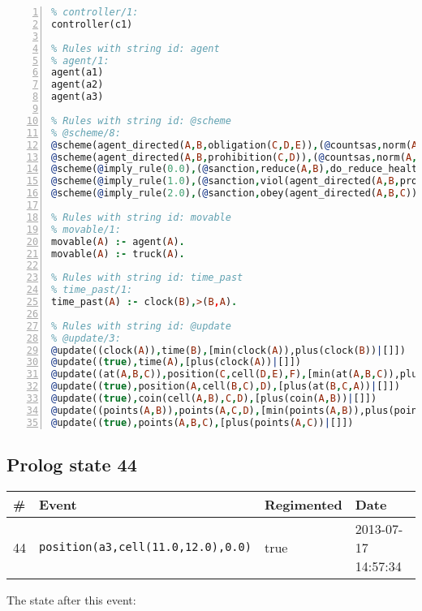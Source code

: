 \documentclass[11pt]{article}\usepackage[utf8]{inputenc}\usepackage{geometry}
\begin{document}
\begin{lstlisting}[language=Prolog, numbers=left]
% Rules with string id: controller
% controller/1:
controller(c1)

% Rules with string id: agent
% agent/1:
agent(a1)
agent(a2)
agent(a3)

% Rules with string id: @scheme
% @scheme/8:
@scheme(agent_directed(A,B,obligation(C,D,E)),(@countsas,norm(A,B,F,obligation(C,D,E)),F),false,(listTrue(C)),(time_past(D)),false,[plus(viol(agent_directed(A,B,obligation(C,D,E))))|[]],[plus(obey(agent_directed(A,B,obligation(C,D,E))))|[]])
@scheme(agent_directed(A,B,prohibition(C,D)),(@countsas,norm(A,B,E,prohibition(C,D)),E),(listTrue(C)),false,(false),false,[plus(viol(agent_directed(A,B,prohibition(C,D))))|[]],[plus(obey(agent_directed(A,B,prohibition(C,D))))|[]])
@scheme(@imply_rule(0.0),(@sanction,reduce(A,B),do_reduce_health(A,B),notifyAgent(A,changed(status))),true,false,false,false,[min(reduce(A,B))|[]],[])
@scheme(@imply_rule(1.0),(@sanction,viol(agent_directed(A,B,prohibition(C,D))),do_sanction(D)),true,false,false,false,[min(viol(agent_directed(A,B,prohibition(C,D))))|[]],[])
@scheme(@imply_rule(2.0),(@sanction,obey(agent_directed(A,B,C))),true,false,false,false,[min(obey(agent_directed(A,B,C)))|[]],[])

% Rules with string id: movable
% movable/1:
movable(A) :- agent(A).
movable(A) :- truck(A).

% Rules with string id: time_past
% time_past/1:
time_past(A) :- clock(B),>(B,A).

% Rules with string id: @update
% @update/3:
@update((clock(A)),time(B),[min(clock(A)),plus(clock(B))|[]])
@update((true),time(A),[plus(clock(A))|[]])
@update((at(A,B,C)),position(C,cell(D,E),F),[min(at(A,B,C)),plus(at(D,E,C))|[]])
@update((true),position(A,cell(B,C),D),[plus(at(B,C,A))|[]])
@update((true),coin(cell(A,B),C,D),[plus(coin(A,B))|[]])
@update((points(A,B)),points(A,C,D),[min(points(A,B)),plus(points(A,D))|[]])
@update((true),points(A,B,C),[plus(points(A,C))|[]])

\end{lstlisting}
\clearpage 
\subsection{Prolog state 44}
\begin{table}[ht]
\centering 
\begin{tabular}{l l l l} 
\textbf{\#} & \textbf{Event} & \textbf{Regimented} & \textbf{Date} \\ [0.5ex] 
\hline
44&\texttt{position(a3,cell(11.0,12.0),0.0)}&true&2013-07-17 14:57:34\\ [1ex] \hline\end{tabular}
\end{table}
The state after this event:
\end{document}
